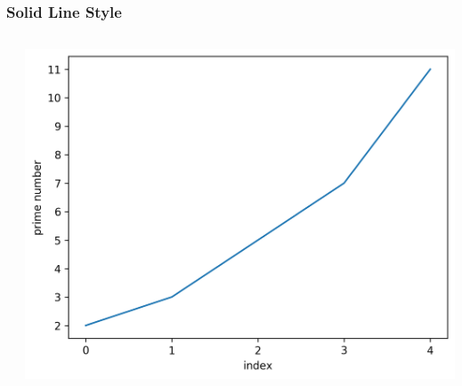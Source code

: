 \documentclass[xcolor={svgnames}]{beamer}
\newcommand{\pyfile}[2][]{}
\begin{document}
\begin{frame}[t,fragile]
    \frametitle{Solid Line Style}
    \vspace{5mm}
    \begin{columns}[T]
        \begin{column}{0.52\textwidth}
            \pyfile{examples/11-solid-line-style.py}
        \end{column}
        \begin{column}{0.48\textwidth}
            \includegraphics[width=\textwidth]{img/11-solid-line-style.png}
        \end{column}
    \end{columns}
\end{frame}
\end{document}
